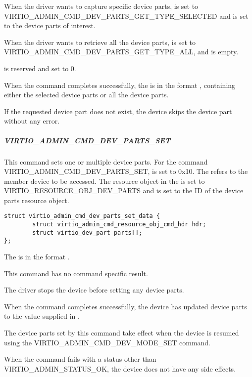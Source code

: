 When the driver wants to capture specific device parts,  is set to
VIRTIO_ADMIN_CMD_DEV_PARTS_GET_TYPE_SELECTED and  is set to the
device parts of interest.

When the driver wants to retrieve all the device parts,  is set to
VIRTIO_ADMIN_CMD_DEV_PARTS_GET_TYPE_ALL, and  is empty.

 is reserved and set to 0.

When the command completes successfully, the  is
in the format , containing
either the selected device parts or all the device parts.

If the requested device part does not exist, the device skips the device part
without any error.

\subparagraph{VIRTIO_ADMIN_CMD_DEV_PARTS_SET}\label{par:Basic Facilities of a Virtio Device / Device groups / Group administration commands / Device parts / Device parts handling commands / VIRTIO-ADMIN-CMD-DEV-PARTS-SET}

This command sets one or multiple device parts. For the command
VIRTIO_ADMIN_CMD_DEV_PARTS_SET,  is set to 0x10.
The  refers to the member device to be accessed.
The resource object  in the  is set to
VIRTIO_RESOURCE_OBJ_DEV_PARTS and  is set to the ID of the
device parts resource object.

\begin{lstlisting}
struct virtio_admin_cmd_dev_parts_set_data {
        struct virtio_admin_cmd_resource_obj_cmd_hdr hdr;
        struct virtio_dev_part parts[];
};
\end{lstlisting}

The  is in the format
.

This command has no command specific result.

The driver stops the device before setting any device parts.

When the command completes successfully, the device has updated device
parts to the value supplied in .

The device parts set by this command take effect when the device is resumed
using the VIRTIO_ADMIN_CMD_DEV_MODE_SET command.

When the command fails with a status other than VIRTIO_ADMIN_STATUS_OK, the
device does not have any side effects.

